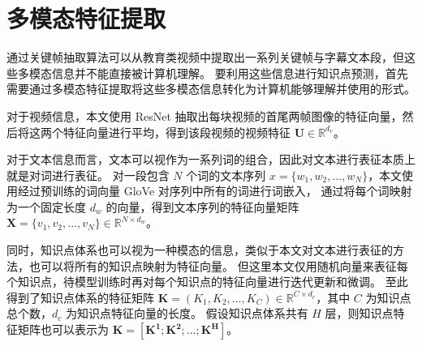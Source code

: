 \section{多模态特征提取}
    通过关键帧抽取算法可以从教育类视频中提取出一系列关键帧与字幕文本段，但这些多模态信息并不能直接被计算机理解。
    要利用这些信息进行知识点预测，首先需要通过多模态特征提取将这些多模态信息转化为计算机能够理解并使用的形式。

    对于视频信息，本文使用 ResNet\cite{He2016DeepRL} 抽取出每块视频的首尾两帧图像的特征向量，然后将这两个特征向量进行平均，得到该段视频的视频特征 $\boldsymbol{U} \in \mathbb{R}^{d_v}$。

    对于文本信息而言，文本可以视作为一系列词的组合，因此对文本进行表征本质上就是对词进行表征。
    对一段包含 $N$ 个词的文本序列 $x = \{w_1, w_2, \dots, w_N\}$，本文使用经过预训练的词向量 GloVe\cite{Pennington2014GloVeGV} 对序列中所有的词进行词嵌入，
    通过将每个词映射为一个固定长度 $d_w$ 的向量，得到文本序列的特征向量矩阵 $\boldsymbol{X} = \{v_1, v_2, \dots, v_N\} \in \mathbb{R}^{N \times d_{w}}$。

    同时，知识点体系也可以视为一种模态的信息，类似于本文对文本进行表征的方法，也可以将所有的知识点映射为特征向量。
    但这里本文仅用随机向量来表征每个知识点，待模型训练时再对每个知识点的特征向量进行迭代更新和微调。
    至此得到了知识点体系的特征矩阵 $\boldsymbol{K} = \left(K_1, K_2, \dots, K_C\right) \in \mathbb{R}^{C \times d_c}$，其中 $C$ 为知识点总个数，$d_c$ 为知识点特征向量的长度。
    假设知识点体系共有 $H$ 层，则知识点特征矩阵也可以表示为 $\boldsymbol{K} = \left[\boldsymbol{K^1}; \boldsymbol{K^2}; \dots; \boldsymbol{K^H}\right]$。


